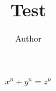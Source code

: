 \documentclass{article}
\title{Test}
\author{Author}
\begin{document}
\maketitle
\[ x^n + y^n = z^n\]
\end{document}
